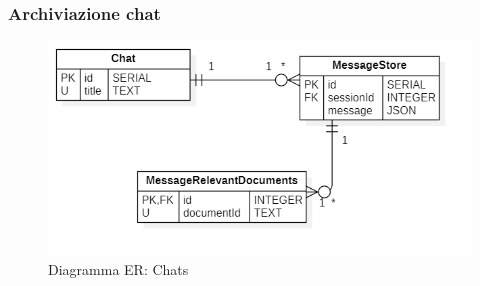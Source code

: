 \documentclass[10pt, a4paper]{article}
\begin{document}
\subsubsection{Archiviazione chat}

\begin{figure}[H]
    \centering        
    \includegraphics[width=15.5cm]{img/ChatDB.png}
    \caption{Diagramma ER: Chats}
\end{figure}
\end{document}
